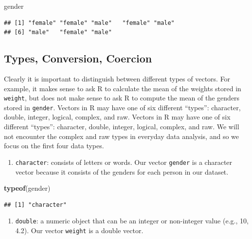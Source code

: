 \documentclass[
]{krantz}
\newenvironment{Shaded}{\begin{snugshade}}{\end{snugshade}}
\newcommand{\KeywordTok}[1]{\textcolor[rgb]{0.13,0.29,0.53}{\textbf{#1}}}
\newcommand{\NormalTok}[1]{#1}
\providecommand{\tightlist}{%
  \setlength{\itemsep}{0pt}\setlength{\parskip}{0pt}}
\begin{document}
\begin{Shaded}
\begin{Highlighting}[]
\NormalTok{gender}
\end{Highlighting}
\end{Shaded}

\begin{verbatim}
## [1] "female" "female" "male"   "female" "male"  
## [6] "male"   "female" "male"
\end{verbatim}

\hypertarget{types-conversion-coercion}{%
\subsection{Types, Conversion, Coercion}\label{types-conversion-coercion}}

Clearly it is important to distinguish between different types of vectors. For example, it makes sense to ask R to calculate the mean of the weights stored in \texttt{weight}, but does not make sense to ask R to compute the mean of the genders stored in \texttt{gender}. Vectors in R may have one of six different ``types'': character, double, integer, logical, complex, and raw. Vectors in R may have one of six different ``types'': character, double, integer, logical, complex, and raw. We will not encounter the complex and raw types in everyday data analysis, and so we focus on the first four data types.

\begin{enumerate}
\def\labelenumi{\arabic{enumi}.}
\tightlist
\item
  \texttt{character}: consists of letters or words. Our vector \texttt{gender} is a character vector because it consists of the genders for each person in our dataset.
\end{enumerate}

\begin{Shaded}
\begin{Highlighting}[]
\KeywordTok{typeof}\NormalTok{(gender)}
\end{Highlighting}
\end{Shaded}

\begin{verbatim}
## [1] "character"
\end{verbatim}

\begin{enumerate}
\def\labelenumi{\arabic{enumi}.}
\setcounter{enumi}{1}
\tightlist
\item
  \texttt{double}: a numeric object that can be an integer or non-integer value (e.g., 10, 4.2). Our vector \texttt{weight} is a double vector.
\end{enumerate}
\end{document}
